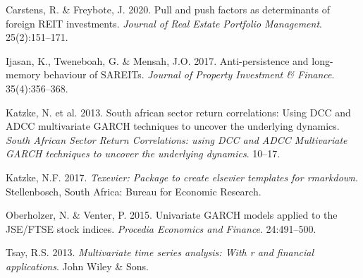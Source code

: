 \documentclass[11pt,preprint, authoryear]{elsarticle}
\numberwithin{equation}{section}
\numberwithin{figure}{section}
\numberwithin{table}{section}
\newlength{\cslhangindent}
\newenvironment{CSLReferences}%
  {\setlength{\parindent}{0pt}%
  \everypar{\setlength{\hangindent}{\cslhangindent}}\ignorespaces}%
  {\par}
\begin{document}
\hypertarget{refs}{}
\begin{CSLReferences}{1}{0}
\leavevmode{}%
Carstens, R. \& Freybote, J. 2020. Pull and push factors as determinants
of foreign REIT investments. \emph{Journal of Real Estate Portfolio
Management}. 25(2):151--171.

\leavevmode{}%
Ijasan, K., Tweneboah, G. \& Mensah, J.O. 2017. Anti-persistence and
long-memory behaviour of SAREITs. \emph{Journal of Property Investment
\& Finance}. 35(4):356--368.

\leavevmode{}%
Katzke, N. et al. 2013. South african sector return correlations: Using
DCC and ADCC multivariate GARCH techniques to uncover the underlying
dynamics. \emph{South African Sector Return Correlations: using DCC and
ADCC Multivariate GARCH techniques to uncover the underlying dynamics}.
10--17.

\leavevmode{}%
Katzke, N.F. 2017. \emph{{Texevier}: {P}ackage to create elsevier
templates for rmarkdown}. Stellenbosch, South Africa: Bureau for
Economic Research.

\leavevmode{}%
Oberholzer, N. \& Venter, P. 2015. Univariate GARCH models applied to
the JSE/FTSE stock indices. \emph{Procedia Economics and Finance}.
24:491--500.

\leavevmode{}%
Tsay, R.S. 2013. \emph{Multivariate time series analysis: With r and
financial applications}. John Wiley \& Sons.

\end{CSLReferences}

\newpage
\appendix
\renewcommand{\thesection}{Appendix A}

\hypertarget{section}{%
\section{\texorpdfstring{\label{aa}}{}}\label{section}}
\end{document}
